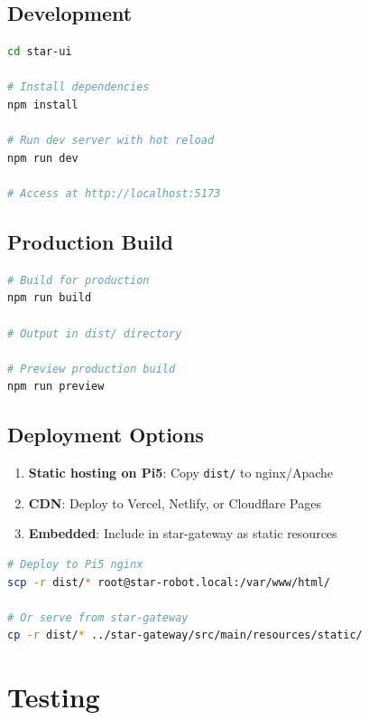 \subsection{Development}

\begin{lstlisting}[language=bash]
cd star-ui

# Install dependencies
npm install

# Run dev server with hot reload
npm run dev

# Access at http://localhost:5173
\end{lstlisting}

\subsection{Production Build}

\begin{lstlisting}[language=bash]
# Build for production
npm run build

# Output in dist/ directory

# Preview production build
npm run preview
\end{lstlisting}

\subsection{Deployment Options}

\begin{enumerate}
    \item \textbf{Static hosting on Pi5}: Copy \texttt{dist/} to nginx/Apache
    \item \textbf{CDN}: Deploy to Vercel, Netlify, or Cloudflare Pages
    \item \textbf{Embedded}: Include in star-gateway as static resources
\end{enumerate}

\begin{lstlisting}[language=bash]
# Deploy to Pi5 nginx
scp -r dist/* root@star-robot.local:/var/www/html/

# Or serve from star-gateway
cp -r dist/* ../star-gateway/src/main/resources/static/
\end{lstlisting}

\section{Testing}

